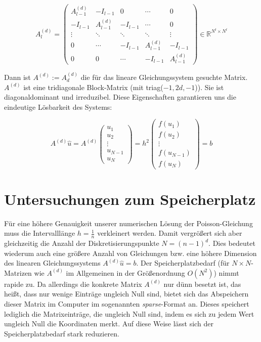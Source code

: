 \documentclass{scrartcl}
\newcommand{\R}{\mathbb{R}}
\begin{document}
\[A^{(d)}_l=
\begin{pmatrix}
   A^{(d)}_{l-1} & -I_{l-1} &  0 & \cdots & 0 \\
  -I_{l-1} &  A^{(d)}_{l-1} & -I_{l-1} & \cdots & 0 \\
   \vdots & \ddots & \ddots & \ddots & \vdots \\
   0 & \cdots & -I_{l-1} &  A^{(d)}_{l-1} & -I_{l-1} \\
   0 & 0 & \cdots & -I_{l-1} &  A^{(d)}_{l-1}
\end{pmatrix}
\in\R^{N^l \times N^l}
\]

Dann ist $A^{(d)} := A^{(d)}_d$ die für das lineare Gleichungssystem gesuchte Matrix. $A^{(d)}$ ist eine tridiagonale Block-Matrix (mit triag($-1, 2d, -1$)). Sie ist diagonaldominant und irreduzibel. Diese Eigenschaften garantieren uns die eindeutige Lösbarkeit des Systems:

\[A^{(d)}\hat{u}=
A^{(d)}
\begin{pmatrix}
  u_1\\
  u_2\\
  \vdots\\
  u_{N-1}\\
  u_N
\end{pmatrix}
=
h^2
\begin{pmatrix}
  f(u_1)\\
  f(u_2)\\
  \vdots\\
  f(u_{N-1})\\
  f(u_N)
\end{pmatrix}
= b
\]

\pagebreak
\section{Untersuchungen zum Speicherplatz}
Für eine höhere Genauigkeit unserer numerischen Lösung der Poisson-Gleichung muss die Intervalllänge $h=\frac{1}{n}$ verkleinert werden.
Damit vergrößert sich aber gleichzeitig die Anzahl der Diskretisierungspunkte $N=(n-1)^d$.
Dies bedeutet wiederum auch eine größere Anzahl von Gleichungen bzw. eine höhere Dimension des linearen Gleichungssystems $A^{(d)}\hat{u}=b$.
Der Speicherplatzbedarf (für $N\times N$-Matrizen wie $A^{(d)}$ im Allgemeinen in der Größenordnung $O(N^2)$) nimmt rapide zu.
Da allerdings die konkrete Matrix $A^{(d)}$ nur dünn besetzt ist, das heißt, dass nur wenige Einträge ungleich Null sind, bietet sich das Abspeichern dieser Matrix im Computer im sogenannten \textit{sparse}-Format an.
Dieses speichert lediglich die Matrixeinträge, die ungleich Null sind, indem es sich zu jedem Wert ungleich Null die Koordinaten merkt.
Auf diese Weise lässt sich der Speicherplatzbedarf stark reduzieren.
\end{document}
